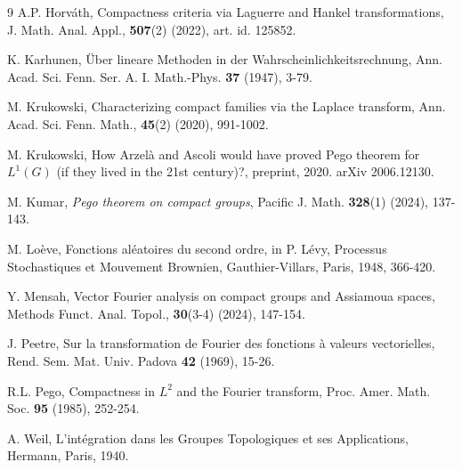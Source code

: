\documentclass[11pt]{amsart}
\begin{document}
\begin{thebibliography}{9}
 A.P. Horv\'ath, Compactness criteria via Laguerre and Hankel transformations, J. Math. Anal.
Appl.,  {\bf 507}(2) (2022), art. id. 125852.

K. Karhunen, \"Uber lineare Methoden in der Wahrscheinlichkeitsrechnung, Ann. Acad. Sci. Fenn. Ser. A. I. Math.-Phys. {\bf 37}  (1947), 3-79.



 M. Krukowski, Characterizing compact families via the Laplace transform, Ann. Acad. Sci.
Fenn. Math., {\bf 45}(2) (2020), 991-1002.

 M. Krukowski, How Arzel\`a and Ascoli would have proved Pego theorem for $L^1(G)$ (if they
lived in the 21st century)?, preprint, 2020. arXiv 2006.12130.




 M. Kumar, \emph{Pego theorem on compact groups}, Pacific J. Math.
\textbf{328}(1) (2024), 137-143.

 M. Lo\`eve, Fonctions al\'eatoires du second ordre, in P. L\'evy, Processus Stochastiques et Mouvement
Brownien, Gauthier-Villars, Paris, 1948, 366-420.

 Y. Mensah, Vector Fourier analysis on compact groups and Assiamoua spaces,  Methods Funct. Anal. Topol., {\bf 30}(3-4) (2024), 147-154.


 J. Peetre, Sur la transformation de Fourier des fonctions \`a valeurs vectorielles, Rend. Sem. Mat. Univ. Padova \textbf{42} (1969), 15-26.

 R.L. Pego, Compactness in $L^2$ and the Fourier transform, Proc.
Amer. Math. Soc. \textbf{95} (1985), 252-254.

 A. Weil, L'int\'egration dans les Groupes Topologiques et ses Applications, Hermann, Paris, 1940.


\end{thebibliography}
\end{document}

